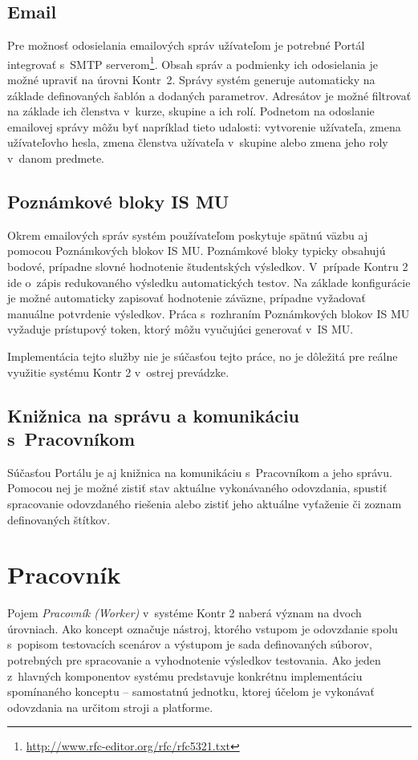 \documentclass[
  digital, %
  oneside, %
  table,   %
  lof,     %
  lot,   %
]{fithesis3}
\newcommand*{\footurl}[1]{\footnote{\url{#1}}}
\begin{document}
\subsection{Email}
Pre možnosť odosielania emailových správ užívateľom je potrebné Portál integrovať s~SMTP serverom\footurl{http://www.rfc-editor.org/rfc/rfc5321.txt}. Obsah správ a podmienky ich odosielania je možné upraviť na úrovni Kontr~2. Správy systém generuje automaticky na základe definovaných šablón a dodaných parametrov. Adresátov je možné filtrovať na základe ich členstva v~kurze, skupine a ich rolí. Podnetom na odoslanie emailovej správy môžu byť napríklad tieto udalosti: vytvorenie užívateľa, zmena užívateľovho hesla, zmena členstva užívateľa v~skupine alebo zmena jeho roly v~danom predmete.

\subsection{Poznámkové bloky IS MU}
Okrem emailových správ systém používateľom poskytuje spätnú väzbu aj pomocou Poznámkových blokov IS MU. Poznámkové bloky typicky obsahujú bodové, prípadne slovné hodnotenie študentských výsledkov. V~prípade Kontru 2 ide o~zápis redukovaného výsledku automatických testov. Na základe konfigurácie je možné automaticky zapisovať hodnotenie záväzne, prípadne vyžadovať manuálne potvrdenie výsledkov. Práca s~rozhraním Poznámkových blokov IS MU vyžaduje prístupový token, ktorý môžu vyučujúci generovať v~IS MU.

Implementácia tejto služby nie je súčasťou tejto práce, no je dôležitá pre reálne využitie systému Kontr 2 v~ostrej prevádzke.

\subsection{Knižnica na správu a komunikáciu s~Pracovníkom}
Súčasťou Portálu je aj knižnica na komunikáciu s~Pracovníkom a jeho správu. Pomocou nej je možné zistiť stav aktuálne vykonávaného odovzdania, spustiť spracovanie odovzdaného riešenia alebo zistiť jeho aktuálne vyťaženie či zoznam definovaných štítkov.

\section{Pracovník}
Pojem \emph{Pracovník (Worker)} v~systéme Kontr 2 naberá význam na dvoch úrovniach. Ako koncept označuje nástroj, ktorého vstupom je odovzdanie spolu s~popisom testovacích scenárov a výstupom je sada definovaných súborov, potrebných pre spracovanie a vyhodnotenie výsledkov testovania. Ako jeden z~hlavných komponentov systému predstavuje konkrétnu implementáciu spomínaného konceptu -- samostatnú jednotku, ktorej účelom je vykonávať odovzdania na určitom stroji a platforme. 
\end{document}
